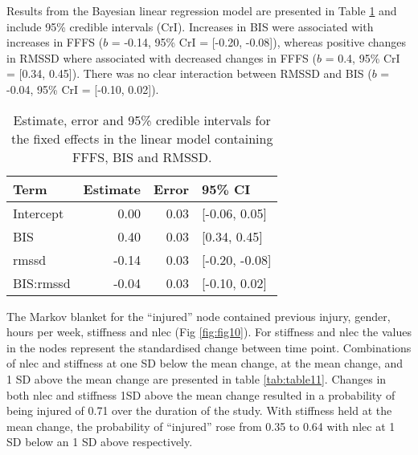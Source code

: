 \documentclass[
  english,
  man]{apa6}
\begin{document}
Results from the Bayesian linear regression model are presented in Table \ref{tab:table10} and include 95\% credible intervals (CrI).
Increases in BIS were associated with increases in FFFS (\(b\) = -0.14, 95\% CrI = {[}-0.20, -0.08{]}), whereas positive changes in RMSSD where associated with decreased changes in FFFS (\(b\) = 0.4, 95\% CrI = {[}0.34, 0.45{]}).
There was no clear interaction between RMSSD and BIS (\(b\) = -0.04, 95\% CrI = {[}-0.10, 0.02{]}).

\begin{table}[H]

\caption{\label{tab:table10}Estimate, error and 95\% credible intervals for the fixed effects in the linear model containing FFFS, BIS and RMSSD.}
\centering
\begin{tabular}[t]{l|r|r|l}
\hline
\textbf{Term} & \textbf{Estimate} & \textbf{Error} & \textbf{95\% CI}\\
\hline
Intercept & 0.00 & 0.03 & [-0.06, 0.05]\\
\hline
BIS & 0.40 & 0.03 & [0.34, 0.45]\\
\hline
rmssd & -0.14 & 0.03 & [-0.20, -0.08]\\
\hline
BIS:rmssd & -0.04 & 0.03 & [-0.10, 0.02]\\
\hline
\end{tabular}
\end{table}

The Markov blanket for the ``injured'' node contained previous injury, gender, hours per week, stiffness and nlec (Fig \ref{fig:fig10}).
For stiffness and nlec the values in the nodes represent the standardised change between time point.
Combinations of nlec and stiffness at one SD below the mean change, at the mean change, and 1 SD above the mean change are presented in table \ref{tab:table11}.
Changes in both nlec and stiffness 1SD above the mean change resulted in a probability of being injured of 0.71 over the duration of the study.
With stiffness held at the mean change, the probability of ``injured'' rose from 0.35 to 0.64 with nlec at 1 SD below an 1 SD above respectively.
\end{document}
